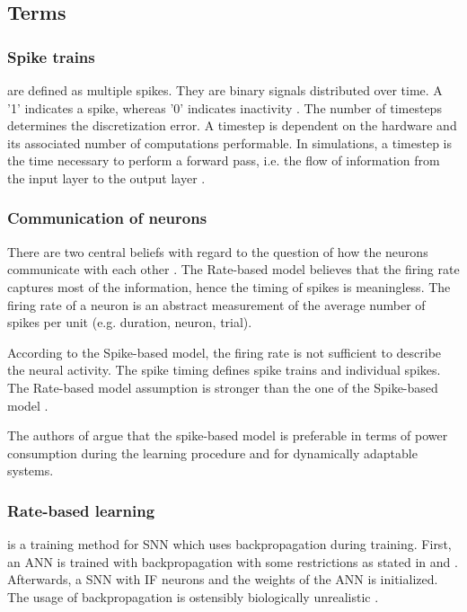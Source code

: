 \newcommand\rbModel{Rate-based model}
\newcommand\sbModel{Spike-based model}
\subsection{Terms}
\label{subsec:terms}

\subsubsection{Spike trains}
are defined as multiple spikes.
They are binary signals distributed over time.
A '1' indicates a spike, whereas '0' indicates inactivity \cite{DIET_SNN}.
The number of timesteps determines the discretization error.
A timestep is dependent on the hardware and its associated number of computations performable.
In simulations, a timestep is the time necessary to perform a forward pass, i.e. the flow of information from the input layer to the output layer \cite{DIET_SNN}.

\subsubsection{Communication of neurons}
\label{subsubsec:communication}
There are two central beliefs with regard to the question of how the neurons communicate with each other \cite{spike_vs_rate}.
The \rbModel{} believes that the firing rate captures most of the information, hence the timing of spikes is meaningless.
The firing rate of a neuron is an abstract measurement of the average number of spikes per unit (e.g. duration, neuron, trial).

According to the \sbModel{}, the firing rate is not sufficient to describe the neural activity.
The spike timing defines spike trains and individual spikes.
The \rbModel{} assumption is stronger than the one of the \sbModel{} \cite{spike_vs_rate}.

The authors of \cite{SNN} argue that the spike-based model is preferable in terms of power consumption 
during the learning procedure and for dynamically adaptable systems.


\subsubsection{Rate-based learning} is a training method for \ac{SNN} which uses backpropagation during training. 
First, an \ac{ANN} is trained with backpropagation with some restrictions as stated in \cite{DIET_SNN} and \cite{ANN_SNN_conversion}.
Afterwards, a \ac{SNN} with \ac{IF} neurons and the weights of the \ac{ANN} is initialized.
The usage of backpropagation is ostensibly biologically unrealistic \cite{SNN,STDP_like}.
